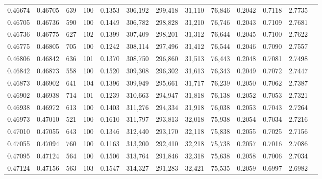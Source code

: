 \begin{tabular}{rrrrrrrrrrrrr}
0.46674 & 0.46705 &   639 & 100 &                                     0.1353 & 306,192 & 299,418 &  31,110 &  76,846 & 0.2042 & 0.7118 & 2.7735 \\
0.46705 & 0.46736 &   590 & 100 &                                     0.1449 & 306,782 & 298,828 &  31,210 &  76,746 & 0.2043 & 0.7109 & 2.7681 \\
0.46736 & 0.46775 &   627 & 102 &                                     0.1399 & 307,409 & 298,201 &  31,312 &  76,644 & 0.2045 & 0.7100 & 2.7622 \\
0.46775 & 0.46805 &   705 & 100 &                                     0.1242 & 308,114 & 297,496 &  31,412 &  76,544 & 0.2046 & 0.7090 & 2.7557 \\
0.46806 & 0.46842 &   636 & 101 &                                     0.1370 & 308,750 & 296,860 &  31,513 &  76,443 & 0.2048 & 0.7081 & 2.7498 \\
0.46842 & 0.46873 &   558 & 100 &                                     0.1520 & 309,308 & 296,302 &  31,613 &  76,343 & 0.2049 & 0.7072 & 2.7447 \\
0.46873 & 0.46902 &   641 & 104 &                                     0.1396 & 309,949 & 295,661 &  31,717 &  76,239 & 0.2050 & 0.7062 & 2.7387 \\
0.46902 & 0.46938 &   714 & 101 &                                     0.1239 & 310,663 & 294,947 &  31,818 &  76,138 & 0.2052 & 0.7053 & 2.7321 \\
0.46938 & 0.46972 &   613 & 100 &                                     0.1403 & 311,276 & 294,334 &  31,918 &  76,038 & 0.2053 & 0.7043 & 2.7264 \\
0.46973 & 0.47010 &   521 & 100 &                                     0.1610 & 311,797 & 293,813 &  32,018 &  75,938 & 0.2054 & 0.7034 & 2.7216 \\
0.47010 & 0.47055 &   643 & 100 &                                     0.1346 & 312,440 & 293,170 &  32,118 &  75,838 & 0.2055 & 0.7025 & 2.7156 \\
0.47055 & 0.47094 &   760 & 100 &                                     0.1163 & 313,200 & 292,410 &  32,218 &  75,738 & 0.2057 & 0.7016 & 2.7086 \\
0.47095 & 0.47124 &   564 & 100 &                                     0.1506 & 313,764 & 291,846 &  32,318 &  75,638 & 0.2058 & 0.7006 & 2.7034 \\
0.47124 & 0.47156 &   563 & 103 &                                     0.1547 & 314,327 & 291,283 &  32,421 &  75,535 & 0.2059 & 0.6997 & 2.6982 \\

\end{tabular}
